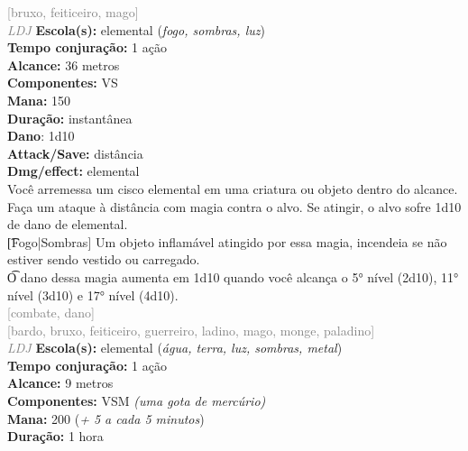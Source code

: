 \documentclass{RPG_Adventure}[2021/10/20]
\begin{document}
{\scriptsize \textcolor{gray}{[bruxo, feiticeiro, mago]\\}}
{\tiny \textcolor{gray}{\textit{LDJ}}}
{\small \t \textbf{Escola(s):} elemental (\textit{fogo, sombras, luz})\\\t \textbf{Tempo conjuração:} 1 ação\\\t \textbf{Alcance:} 36 metros\\\t \textbf{Componentes:} VS\\\t \textbf{Mana:} 150\\\t \textbf{Duração:} instantânea\\\t \textbf{Dano}: 1d10\\\t \textbf{Attack/Save:} distância\\\t \textbf{Dmg/effect:} elemental\\}
{\normalsize Você arremessa um cisco elemental em uma criatura ou objeto dentro do alcance. Faça um ataque à distância com magia contra o alvo. Se atingir, o alvo sofre 1d10 de dano de elemental.\\\t [Fogo|Sombras] Um objeto inflamável atingido por essa magia, incendeia se não estiver sendo vestido ou carregado.\\\t O dano dessa magia aumenta em 1d10 quando você alcança o 5° nível (2d10), 11° nível (3d10) e 17° nível (4d10).\\}
{\scriptsize \textcolor{gray}{[combate, dano]\\}}
{\scriptsize \textcolor{gray}{[bardo, bruxo, feiticeiro, guerreiro, ladino, mago, monge, paladino]\\}}
{\tiny \textcolor{gray}{\textit{LDJ}}}
{\small \t \textbf{Escola(s):} elemental (\textit{água, terra, luz, sombras, metal})\\\t \textbf{Tempo conjuração:} 1 ação\\\t \textbf{Alcance:} 9 metros\\\t \textbf{Componentes:} VSM \textit{(uma gota de mercúrio)}\\\t \textbf{Mana:} 200 (\textit{+ 5 a cada 5 minutos})\\\t \textbf{Duração:} 1 hora\\}
\end{document}
